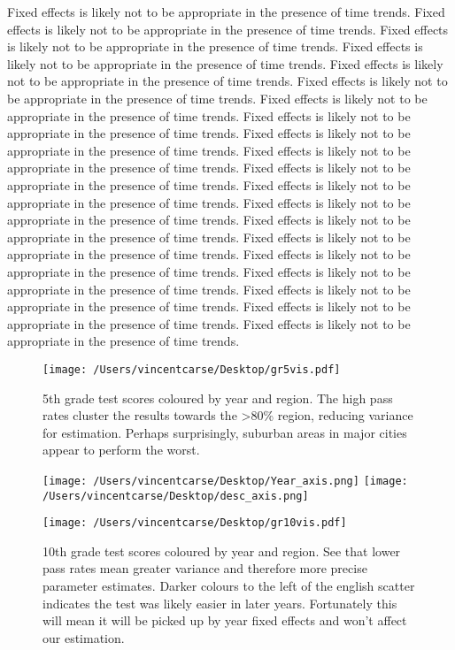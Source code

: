 \documentclass[11pt]{article}
\begin{document}
Fixed effects is likely not to be appropriate in the presence of time trends. 
Fixed effects is likely not to be appropriate in the presence of time trends. 
Fixed effects is likely not to be appropriate in the presence of time trends. 
Fixed effects is likely not to be appropriate in the presence of time trends. 
Fixed effects is likely not to be appropriate in the presence of time trends. 
Fixed effects is likely not to be appropriate in the presence of time trends. 
Fixed effects is likely not to be appropriate in the presence of time trends. 
Fixed effects is likely not to be appropriate in the presence of time trends. 
Fixed effects is likely not to be appropriate in the presence of time trends. 
Fixed effects is likely not to be appropriate in the presence of time trends. 
Fixed effects is likely not to be appropriate in the presence of time trends. 
Fixed effects is likely not to be appropriate in the presence of time trends. 
Fixed effects is likely not to be appropriate in the presence of time trends. 
Fixed effects is likely not to be appropriate in the presence of time trends. 
Fixed effects is likely not to be appropriate in the presence of time trends. 
Fixed effects is likely not to be appropriate in the presence of time trends. 
Fixed effects is likely not to be appropriate in the presence of time trends. 
Fixed effects is likely not to be appropriate in the presence of time trends. 
Fixed effects is likely not to be appropriate in the presence of time trends. 
Fixed effects is likely not to be appropriate in the presence of time trends. 



\begin{figure}
    \label{Can I see this label?}
    \texttt{[image: /Users/vincentcarse/Desktop/gr5vis.pdf]}
    \caption{5th grade test scores coloured by year and region. The high pass rates cluster the results towards the \textgreater80\% region, reducing variance for estimation. Perhaps surprisingly, suburban areas in major cities appear to perform the worst.}
\end{figure}

\begin{figure}
    \label{Can I see this label?}
    \texttt{[image: /Users/vincentcarse/Desktop/Year\_axis.png]}
    \texttt{[image: /Users/vincentcarse/Desktop/desc\_axis.png]}
\end{figure}


\begin{figure}
    \label{image-myimage}
    \texttt{[image: /Users/vincentcarse/Desktop/gr10vis.pdf]}
    \caption{10th grade test scores coloured by year and region. See that lower pass rates mean greater variance and therefore more precise parameter estimates. Darker colours to the left of the english scatter indicates the test was likely easier in later years. Fortunately this will mean it will be picked up by year fixed effects and won't affect our estimation.}
\end{figure}
\end{document}
